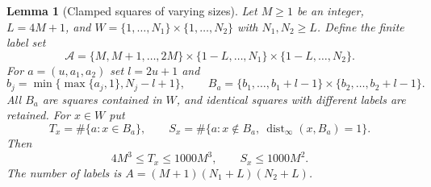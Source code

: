 \documentclass[11pt]{amsart}
\newtheorem{lemma}[theorem]{Lemma}
\theoremstyle{definition}
\newcommand{\dist}{\operatorname{dist}_\infty}
\newcommand{\1}{\mathbf 1}
\begin{document}
\begin{lemma}[Clamped squares of varying sizes]
\label{lem:count}
Let $M\ge1$ be an integer, $L=4M+1$, and
$W=\{1,\ldots,N_1\}\times\{1,\ldots,N_2\}$ with $N_1,N_2\ge L$.
Define the finite label set
\[
 \mathcal A=\{M,M+1,\ldots,2M\}
        \times\{1-L,\ldots,N_1\}\times\{1-L,\ldots,N_2\}.
\]
For $a=(u,a_1,a_2)$ set $l=2u+1$ and
\[
 b_j=\min\{\max\{a_j,1\},N_j-l+1\},\qquad
 B_a=\{b_1,\ldots,b_1+l-1\}\times\{b_2,\ldots,b_2+l-1\}.
\]
All $B_a$ are squares contained in $W$, and identical squares with
different labels are retained. For $x\in W$ put
\[
 T_x=\#\{a:x\in B_a\},\qquad
 S_x=\#\{a:x\notin B_a,\ \dist(x,B_a)=1\}.
\]
Then
\begin{equation}\label{eq:counts}
 4M^3\le T_x\le1000M^3,\qquad S_x\le1000M^2.
\end{equation}
The number of labels is
$A=(M+1)(N_1+L)(N_2+L)$.
\end{lemma}
\end{document}
